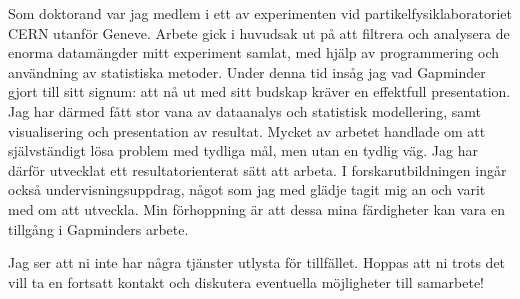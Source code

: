 \documentclass[11pt, a4paper]{../awesome-cv} %
\begin{document}
\begin{cvletter}
Som doktorand var jag medlem i ett av experimenten vid partikelfysiklaboratoriet CERN utanför Geneve.
Arbete gick i huvudsak ut på att filtrera och analysera de enorma datamängder mitt experiment samlat, med hjälp av programmering och användning av statistiska metoder.
Under denna tid insåg jag vad Gapminder gjort till sitt signum: att nå ut med sitt budskap kräver en effektfull presentation. 
Jag har därmed fått stor vana av dataanalys och statistisk modellering, samt visualisering och presentation av resultat.
Mycket av arbetet handlade om att självständigt lösa problem med tydliga mål, men utan en tydlig väg.
Jag har därför utvecklat ett resultatorienterat sätt att arbeta.
I forskarutbildningen ingår också undervisningsuppdrag, något som jag med glädje tagit mig an och varit med om att utveckla. 
Min förhoppning är att dessa mina färdigheter kan vara en tillgång i Gapminders arbete.

Jag ser att ni inte har några tjänster utlysta för tillfället.
Hoppas att ni trots det vill ta en fortsatt kontakt och diskutera eventuella möjligheter till samarbete!


\end{cvletter}


\makeletterclosing %
\end{document}
